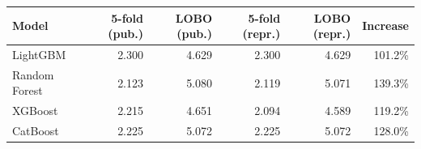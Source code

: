 \begin{tabular}{lrrrrr}
\toprule
Model & 5-fold (pub.) & LOBO (pub.) & 5-fold (repr.) & LOBO (repr.) & Increase \\
\midrule
LightGBM & 2.300 & 4.629 & 2.300 & 4.629 & 101.2\% \\
Random Forest & 2.123 & 5.080 & 2.119 & 5.071 & 139.3\% \\
XGBoost & 2.215 & 4.651 & 2.094 & 4.589 & 119.2\% \\
CatBoost & 2.225 & 5.072 & 2.225 & 5.072 & 128.0\% \\
\bottomrule
\end{tabular}
